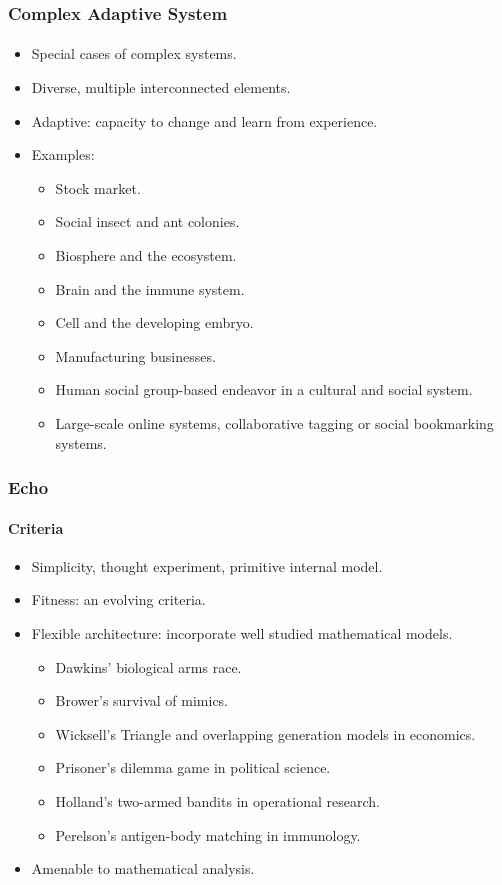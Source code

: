 \frame
{
	\frametitle{Complex Adaptive System}
	\framesubtitle{}

	\begin{itemize}
		\item Special cases of complex systems.
		\item Diverse, multiple interconnected elements.
		\item Adaptive: capacity to change and learn from experience.
		\item Examples:
		\begin{itemize}
			\item Stock market.
			\item Social insect and ant colonies.
			\item Biosphere and the ecosystem.
			\item Brain and the immune system.
			\item Cell and the developing embryo.
			\item Manufacturing businesses.
			\item Human social group-based endeavor in a cultural and social system.
			\item Large-scale online systems, collaborative tagging or social bookmarking systems.
		\end{itemize}
	\end{itemize}
}
%
%

\frame
{
	\frametitle{Echo}
	\framesubtitle{Criteria}

	\begin{itemize}
		\item Simplicity, thought experiment, primitive internal model.
		\item Fitness: an evolving criteria.
		\item Flexible architecture: incorporate well studied mathematical models.
		\begin{itemize}
			\item Dawkins' biological arms race.
			\item Brower's survival of mimics.
			\item Wicksell's Triangle and overlapping generation models in economics.
			\item Prisoner's dilemma game in political science.
			\item Holland's two-armed bandits in operational research.
			\item Perelson's antigen-body matching in immunology.
		\end{itemize}
		\item Amenable to mathematical analysis.
	\end{itemize}
}